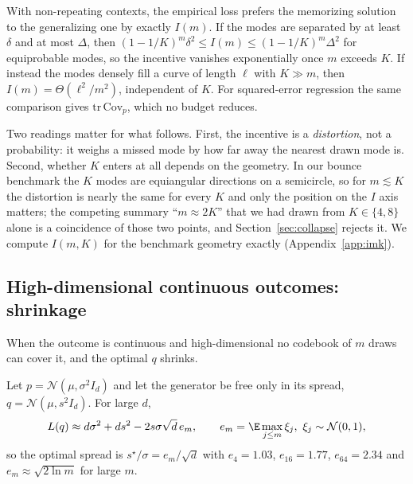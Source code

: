\begin{proposition}
\label{prop:memo}
With non-repeating contexts, the empirical \nom{} loss prefers the memorizing solution to the generalizing one by exactly $I(m)$. If the modes are separated by at least $\delta$ and at most $\Delta$, then $(1 - 1/K)^m \delta^2 \le I(m) \le (1-1/K)^m \Delta^2$ for equiprobable modes, so the incentive vanishes exponentially once $m$ exceeds $K$. If instead the modes densely fill a curve of length $\ell$ with $K \gg m$, then $I(m) = \Theta(\ell^2/m^2)$, independent of $K$. For squared-error regression the same comparison gives $\mathrm{tr}\,\mathrm{Cov}_p$, which no budget reduces.
\end{proposition}

Two readings matter for what follows. First, the incentive is a \emph{distortion}, not a probability: it weighs a missed mode by how far away the nearest drawn mode is. Second, whether $K$ enters at all depends on the geometry. In our bounce benchmark the $K$ modes are equiangular directions on a semicircle, so for $m \lesssim K$ the distortion is nearly the same for every $K$ and only the position on the $I$ axis matters; the competing summary ``$m \approx 2K$'' that we had drawn from $K \in \{4, 8\}$ alone is a coincidence of those two points, and Section~\ref{sec:collapse} rejects it. We compute $I(m,K)$ for the benchmark geometry exactly (Appendix~\ref{app:imk}).

\subsection{High-dimensional continuous outcomes: shrinkage}
\label{sec:theory_shrink}
When the outcome is continuous and high-dimensional no codebook of $m$ draws can cover it, and the optimal $q$ shrinks.

\begin{proposition}
\label{prop:shrink}
Let $p = \mathcal{N}(\mu, \sigma^2 I_d)$ and let the generator be free only in its spread, $q = \mathcal{N}(\mu, s^2 I_d)$. For large $d$,
\begin{equation}
L(q) \approx d\sigma^2 + d s^2 - 2 s \sigma \sqrt{d}\, e_m,\qquad e_m = \E\max_{j \le m} \xi_j,\ \xi_j \sim \mathcal{N}(0,1),
\end{equation}
so the optimal spread is $s^\star / \sigma = e_m / \sqrt{d}$ with $e_4 = 1.03$, $e_{16} = 1.77$, $e_{64} = 2.34$ and $e_m \approx \sqrt{2 \ln m}$ for large $m$.
\end{proposition}

